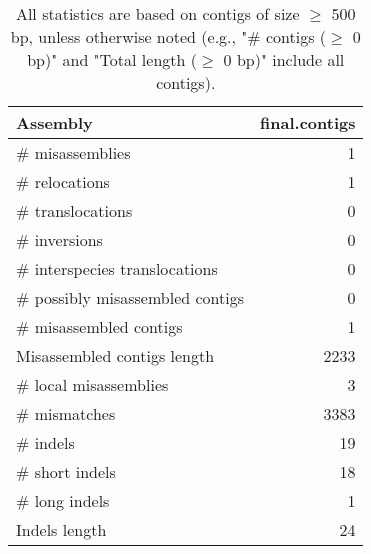 \documentclass[12pt,a4paper]{article}
\begin{document}
\begin{table}[ht]
\begin{center}
\caption{All statistics are based on contigs of size $\geq$ 500 bp, unless otherwise noted (e.g., "\# contigs ($\geq$ 0 bp)" and "Total length ($\geq$ 0 bp)" include all contigs).}
\begin{tabular}{|l*{1}{|r}|}
\hline
Assembly & final.contigs \\ \hline
\# misassemblies & 1 \\ \hline
\hspace{5mm}\# relocations & 1 \\ \hline
\hspace{5mm}\# translocations & 0 \\ \hline
\hspace{5mm}\# inversions & 0 \\ \hline
\hspace{5mm}\# interspecies translocations & 0 \\ \hline
\# possibly misassembled contigs & 0 \\ \hline
\# misassembled contigs & 1 \\ \hline
Misassembled contigs length & 2233 \\ \hline
\# local misassemblies & 3 \\ \hline
\# mismatches & 3383 \\ \hline
\# indels & 19 \\ \hline
\hspace{5mm}\# short indels & 18 \\ \hline
\hspace{5mm}\# long indels & 1 \\ \hline
Indels length & 24 \\ \hline
\end{tabular}
\end{center}
\end{table}
\end{document}
